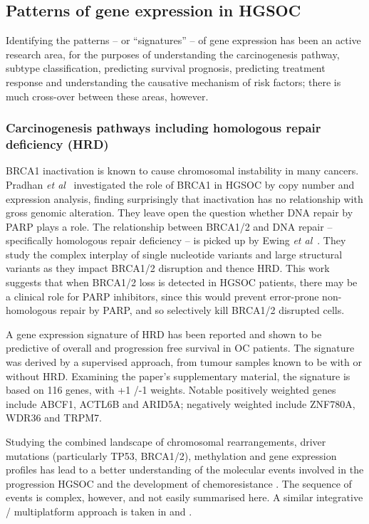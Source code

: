 \documentclass[tikz, 11pt,a4paper,oneside,fleqn]{article}
\newcommand{\etal}{{\em et al\/}}
\begin{document}
\subsection{Patterns of gene expression in HGSOC}
\label{sec-review-of-gene-expression}
Identifying the patterns -- or ``signatures'' -- of gene expression has been an active research area, for the purposes of understanding the carcinogenesis pathway, subtype classification, predicting survival prognosis, predicting treatment response and understanding the causative mechanism of risk factors; there is much cross-over between these areas, however.

\subsubsection{Carcinogenesis pathways including homologous repair deficiency (HRD)}

BRCA1 inactivation is known to cause chromosomal instability in many cancers.  Pradhan \etal\ \cite{Pradhan2010} investigated the role of BRCA1 in HGSOC by copy number and expression analysis, finding surprisingly that inactivation has no relationship with gross genomic alteration.  They leave open the question whether DNA repair by PARP plays a role.   The relationship between BRCA1/2 and DNA repair -- specifically homologous repair deficiency -- is picked up by Ewing \etal\ \cite{Ewing2020}.  They study the complex interplay of single nucleotide variants and large structural variants as they impact BRCA1/2 disruption and thence HRD.  This work suggests that when BRCA1/2 loss is detected in HGSOC patients, there may be a clinical role for PARP inhibitors, since this would prevent error-prone non-homologous repair by PARP, and so selectively kill BRCA1/2 disrupted cells.  

A gene expression signature of HRD has been reported \cite{Lu2014} and shown to be predictive of overall and progression free survival in OC patients.  The signature was derived by a supervised approach, from tumour samples known to be with or without HRD.  Examining the paper's supplementary material, the signature is based on 116 genes, with +1 /-1 weights.  Notable positively weighted genes include ABCF1, ACTL6B and ARID5A; negatively weighted include ZNF780A, WDR36 and TRPM7.

Studying the combined landscape of chromosomal rearrangements, driver mutations (particularly TP53, BRCA1/2), methylation and gene expression profiles has lead to a better understanding of the molecular events involved in the progression HGSOC and the development of chemoresistance \cite{Patch2015}.  The sequence of events is complex, however, and not easily summarised here.   A similar integrative / multiplatform approach is taken in \cite{He2017a} and \cite{Hoadley2014}.  
\end{document}
